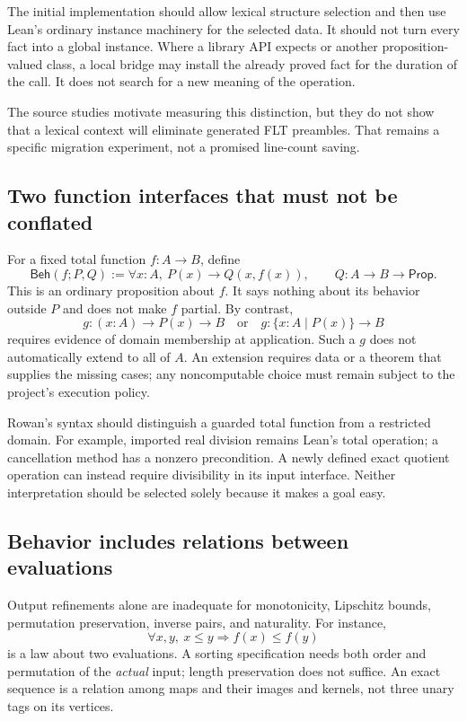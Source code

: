 \documentclass[11pt,letterpaper]{article}
\newcommand{\code}[1]{\texttt{\detokenize{#1}}}
\newcommand{\Beh}{\mathsf{Beh}}\newcommand{\Req}{\mathsf{Req}}
\theoremstyle{definition}\newtheorem{definition}[theorem]{Definition}
\theoremstyle{remark}\newtheorem{remark}[theorem]{Remark}
\begin{document}
The initial implementation should allow lexical structure selection and then
use Lean's ordinary instance machinery for the selected data. It should not
turn every fact into a global instance. Where a library API expects
\code{Fact P} or another proposition-valued class, a local bridge may install
the already proved fact for the duration of the call. It does not search for
a new meaning of the operation.

The source studies motivate measuring this distinction, but they do not show
that a lexical context will eliminate generated FLT preambles. That remains a
specific migration experiment, not a promised line-count saving.

\subsection{Two function interfaces that must not be conflated}
For a fixed total function $f:A\to B$, define
\[
 \Beh(f;P,Q):=\forall x:A,\ P(x)\to Q(x,f(x)),
 \qquad Q:A\to B\to\mathsf{Prop}.
\]
This is an ordinary proposition about $f$. It says nothing about its behavior
outside $P$ and does not make $f$ partial. By contrast,
\[
 g:(x:A)\to P(x)\to B
 \quad\text{or}\quad g:\{x:A\mid P(x)\}\to B
\]
requires evidence of domain membership at application. Such a $g$ does not
automatically extend to all of $A$. An extension requires data or a theorem
that supplies the missing cases; any noncomputable choice must remain subject
to the project's execution policy.

Rowan's syntax should distinguish a guarded total function from a restricted
domain. For example, imported real division remains Lean's total operation;
a cancellation method has a nonzero precondition. A newly defined exact
quotient operation can instead require divisibility in its input interface.
Neither interpretation should be selected solely because it makes a goal easy.

\subsection{Behavior includes relations between evaluations}
Output refinements alone are inadequate for monotonicity, Lipschitz bounds,
permutation preservation, inverse pairs, and naturality. For instance,
\[
 \forall x,y,\ x\le y\Longrightarrow f(x)\le f(y)
\]
is a law about two evaluations. A sorting specification needs both order and
permutation of the \emph{actual} input; length preservation does not suffice.
An exact sequence is a relation among maps and their images and kernels, not
three unary tags on its vertices.
\end{document}

